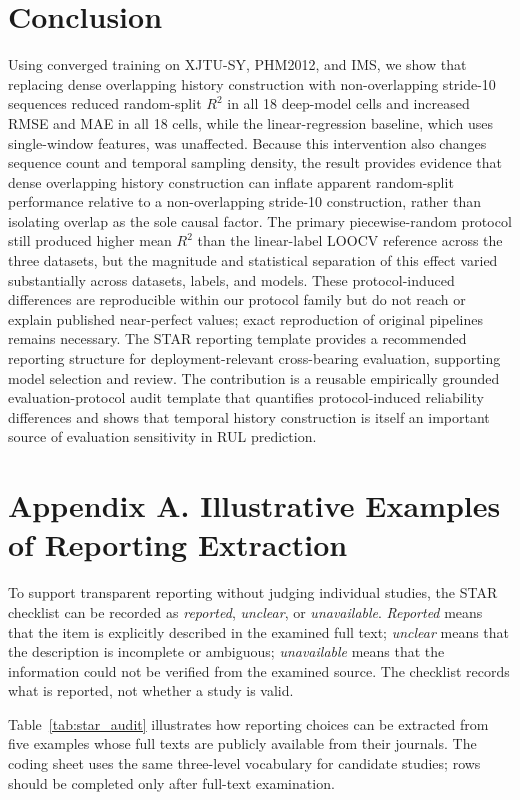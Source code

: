 \documentclass[pdflatex,sn-basic,NameDate]{sn-jnl}
\begin{document}
\section{Conclusion}
Using converged training on XJTU-SY, PHM2012, and IMS, we show that replacing dense overlapping history construction with non-overlapping stride-10 sequences reduced random-split $R^2$ in all 18 deep-model cells and increased RMSE and MAE in all 18 cells, while the linear-regression baseline, which uses single-window features, was unaffected. Because this intervention also changes sequence count and temporal sampling density, the result provides evidence that dense overlapping history construction can inflate apparent random-split performance relative to a non-overlapping stride-10 construction, rather than isolating overlap as the sole causal factor. The primary piecewise-random protocol still produced higher mean $R^2$ than the linear-label LOOCV reference across the three datasets, but the magnitude and statistical separation of this effect varied substantially across datasets, labels, and models. These protocol-induced differences are reproducible within our protocol family but do not reach or explain published near-perfect values; exact reproduction of original pipelines remains necessary. The STAR reporting template provides a recommended reporting structure for deployment-relevant cross-bearing evaluation, supporting model selection and review. The contribution is a reusable empirically grounded evaluation-protocol audit template that quantifies protocol-induced reliability differences and shows that temporal history construction is itself an important source of evaluation sensitivity in RUL prediction.

\appendix
\section*{Appendix A. Illustrative Examples of Reporting Extraction}
To support transparent reporting without judging individual studies, the STAR checklist can be recorded as \emph{reported}, \emph{unclear}, or \emph{unavailable}. \emph{Reported} means that the item is explicitly described in the examined full text; \emph{unclear} means that the description is incomplete or ambiguous; \emph{unavailable} means that the information could not be verified from the examined source. The checklist records what is reported, not whether a study is valid.

Table~\ref{tab:star_audit} illustrates how reporting choices can be extracted from five examples whose full texts are publicly available from their journals. The coding sheet uses the same three-level vocabulary for candidate studies; rows should be completed only after full-text examination.
\end{document}

